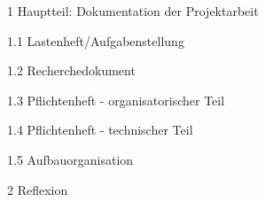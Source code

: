 \begin{Huge}
1 Hauptteil: Dokumentation der Projektarbeit
\end{Huge}
\newpage
\begin{Huge}
1.1 Lastenheft/Aufgabenstellung
\end{Huge}
\newpage
\begin{Huge}
1.2 Recherchedokument
\end{Huge}
\newpage
\begin{Huge}
1.3 Pflichtenheft - organisatorischer Teil
\end{Huge}
\newpage
\begin{Huge}
1.4 Pflichtenheft - technischer Teil
\end{Huge}
\newpage
\begin{Huge}
1.5 Aufbauorganisation
\end{Huge}
\newpage
\begin{Huge}
2 Reflexion
\end{Huge}
